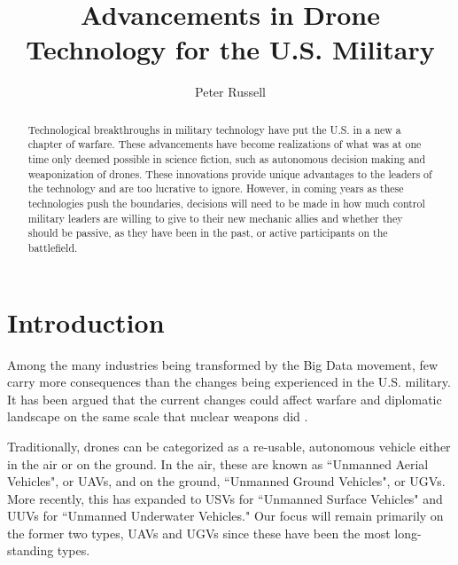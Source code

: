 \documentclass[sigconf]{acmart}
\begin{document}
\title{Advancements in Drone Technology for the U.S. Military}

\author{Peter Russell}

\begin{abstract}
Technological breakthroughs in military technology have put the U.S. in a new a chapter of warfare. These advancements have become realizations of what was at one time only deemed possible in science fiction, such as autonomous decision making and weaponization of drones. These innovations provide unique advantages to the leaders of the technology and are too lucrative to ignore. However, in coming years as these technologies push the boundaries, decisions will need to be made in how much control military leaders are willing to give to their new mechanic allies and whether they should be passive, as they have been in the past, or active participants on the battlefield.
\end{abstract}


\maketitle

\section{Introduction}
Among the many industries being transformed by the Big Data movement, few carry more consequences than the changes being experienced in the U.S. military. It has been argued that the current changes could affect warfare and diplomatic landscape on the same scale that nuclear weapons did \cite{aireport}. 

Traditionally, drones can be categorized as a re-usable, autonomous vehicle either in the air or on the ground. In the air, these are known as ``Unmanned Aerial Vehicles", or UAVs, and on the ground, ``Unmanned Ground Vehicles", or UGVs. More recently, this has expanded to USVs for ``Unmanned Surface Vehicles" and UUVs for ``Unmanned Underwater Vehicles." Our focus will remain primarily on the former two types, UAVs and UGVs since these have been the most long-standing types.
\end{document}
